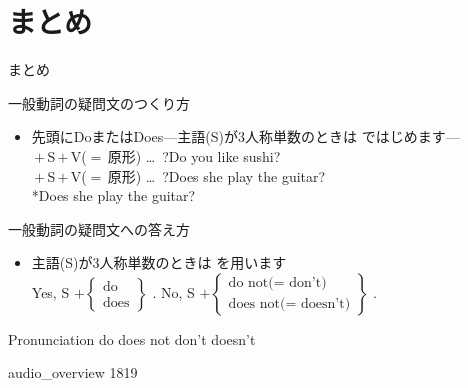 \documentclass[aspectratio=169,dvipsnames]{beamer}
\newcommand{\myaudio}[1]{\href{#1}{\faVolumeUp}}
\begin{document}
\section{まとめ}
\begin{frame}[plain]{まとめ}
 

\begin{block}{一般動詞の疑問文のつくり方}\small
\begin{itemize}[square]
 \item   先頭にDoまたはDoes\hspace{10pt}---主語(S)が3人称単数のときは\,\,ではじめます---\\
	 \,$+$\,S\,$+$\,V{\scriptsize ($=$\,原形)} \ldots\,\,\,?\hfill{}Do you like sushi?\\
	 \,$+$\,S\,$+$\,V{\scriptsize ($=$\,原形)} \ldots\,\,\,?\hfill{}Does she play the guitar?\\
\hfill{}*Does she play the guitar?
\end{itemize}
     \end{block}

\begin{block}{一般動詞の疑問文への答え方}\small
\begin{itemize}[square]
 \item 主語(S)が3人称単数のときは\,\,を用います\\
Yes, S $+ \left\{\begin{array}{l}
		  \text{do}\\
		\text{does}\end{array}\right\}$\,\,.
\hspace{20pt}
No, S $+ \left\{\begin{array}{l}
		  \text{do not($=$ don't)}\\
		\text{does not($=$ doesn't)}\end{array}\right\}$\,\,.
\end{itemize}
      \end{block}

\begin{block}{Pronunciation}
 do \hspace{15pt}does \hspace{15pt}not \hspace{15pt}don't \hspace{15pt}doesn't 
\end{block}
\vspace{-8pt}
\hfill{\tiny audio\_overview 1819}\,{\scriptsize \myaudio{./audio/overview/011_answer_do_audio_overview.mp4}}

\end{frame}
\end{document}
